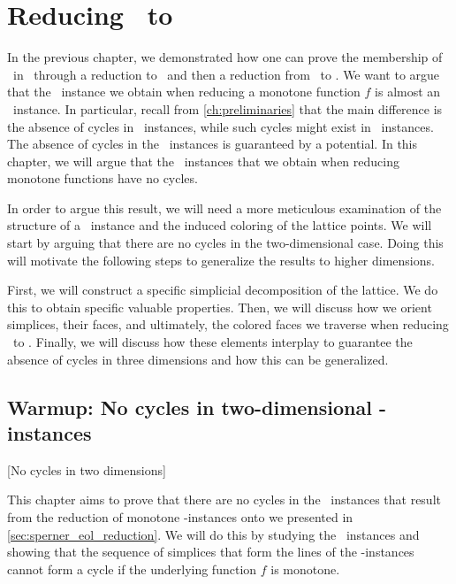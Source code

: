 \setchapterpreamble[u]{\margintoc}
\chapter{Reducing \Tarski\ to \EOPL}
\label{ch:eopl_reduction}

In the previous chapter, we demonstrated how one can prove the membership of \Tarski\ in \PPAD\ through a reduction to \Sperner\ and then a reduction from \Sperner\ to \EndOfLine. We want to argue that the \EndOfLine\ instance we obtain when reducing a monotone function $f$ is almost an \EndOfPotentialLine\ instance. In particular, recall from \cref{ch:preliminaries} that the main difference is the absence of cycles in \EndOfPotentialLine\ instances, while such cycles might exist in \EndOfLine\ instances. The absence of cycles in the \EndOfPotentialLine\ instances is guaranteed by a potential. In this chapter, we will argue that the \EndOfLine\ instances that we obtain when reducing monotone functions have no cycles.

In order to argue this result, we will need a more meticulous examination of the structure of a \Tarski\ instance and the induced coloring of the lattice points. We will start by arguing that there are no cycles in the two-dimensional case. Doing this will motivate the following steps to generalize the results to higher dimensions.

First, we will construct a specific simplicial decomposition of the lattice. We do this to obtain specific valuable properties. Then, we will discuss how we orient simplices, their faces, and ultimately, the colored faces we traverse when reducing \Sperner\ to \EndOfLine. Finally, we will discuss how these elements interplay to guarantee the absence of cycles in three dimensions and how this can be generalized.

\section{Warmup: No cycles in two-dimensional \Tarskistar-instances}[No cycles in two dimensions]

This chapter aims to prove that there are no cycles in the \EndOfLine\ instances that result from the reduction of monotone \Tarskistar-instances onto \EndOfLine we presented in \cref{sec:sperner_eol_reduction}. We will do this by studying the \Sperner\ instances and showing that the sequence of simplices that form the lines of the \EndOfLine-instances cannot form a cycle if the underlying function $f$ is monotone.

